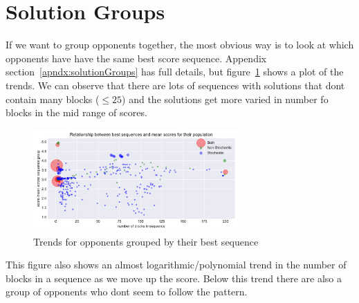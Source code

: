 \section{Solution Groups}\label{sec:solutionGroups}
If we want to group opponents together, the most obvious way is to look at which opponents have have the same best score sequence.
Appendix section~\ref{apndx:solutionGroups} has full details, but figure~\ref{fig:sequence_scatter} shows a plot of the trends. 
We can observe that there are lots of sequences with solutions that dont contain many blocks ($\le 25$) and the solutions get more varied in number fo blocks in the mid range of scores.
\begin{figure}[ht]
    \includegraphics[width=0.7\textwidth, center]{./img/descriptive/sequence_scatter_colour.pdf}
    \caption{Trends for opponents grouped by their best sequence}\label{fig:sequence_scatter}
\end{figure}

This figure also shows an almost logarithmic/polynomial trend in the number of blocks in a sequence as we move up the score.
Below this trend there are also a group of opponents who dont seem to follow the pattern. 

